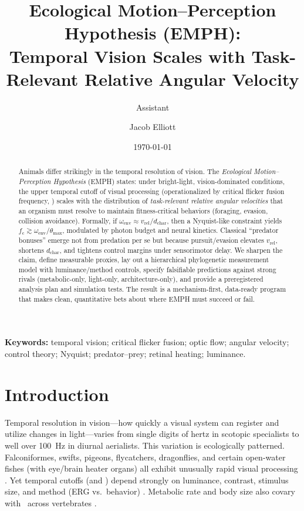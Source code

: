 \documentclass[11pt]{article}
\title{\vspace{-10pt}\textbf{Ecological Motion--Perception Hypothesis (EMPH):}\\
Temporal Vision Scales with Task-Relevant Relative Angular Velocity}
\author[1]{Assistant}
\author[2]{Jacob Elliott}
\affil[1,2]{\small Independent Research Draft (v0.2)}
\date{\small \today}
\newcommand{\fc}{f_{\mathrm{c}}}             %
\newcommand{\cff}{\mathrm{CFF}}               %
\newcommand{\vrel}{v_{\mathrm{rel}}}          %
\newcommand{\dchar}{d_{\mathrm{char}}}        %
\newcommand{\thetamax}{\theta_{\max}}         %
\begin{document}
\maketitle
\doublespacing

\begin{abstract}
Animals differ strikingly in the temporal resolution of vision. The \emph{Ecological Motion--Perception Hypothesis} (EMPH) states: under bright-light, vision-dominated conditions, the upper temporal cutoff of visual processing (operationalized by critical flicker fusion frequency, \cff) scales with the distribution of \emph{task-relevant relative angular velocities} that an organism must resolve to maintain fitness-critical behaviors (foraging, evasion, collision avoidance). Formally, if $\omega_{\text{env}} \approx \vrel/\dchar$, then a Nyquist-like constraint yields $\fc \gtrsim \omega_{\text{env}}/\thetamax$, modulated by photon budget and neural kinetics. Classical ``predator bonuses'' emerge not from predation per se but because pursuit/evasion elevates $\vrel$, shortens $\dchar$, and tightens control margins under sensorimotor delay. We sharpen the claim, define measurable proxies, lay out a hierarchical phylogenetic measurement model with luminance/method controls, specify falsifiable predictions against strong rivals (metabolic-only, light-only, architecture-only), and provide a preregistered analysis plan and simulation tests. The result is a mechanism-first, data-ready program that makes clean, quantitative bets about where EMPH must succeed or fail.
\end{abstract}

\noindent\textbf{Keywords:} temporal vision; critical flicker fusion; optic flow; angular velocity; control theory; Nyquist; predator--prey; retinal heating; luminance.

\section{Introduction}
Temporal resolution in vision---how quickly a visual system can register and utilize changes in light---varies from single digits of hertz in scotopic specialists to well over \SI{100}{Hz} in diurnal aerialists. This variation is ecologically patterned. Falconiformes, swifts, pigeons, flycatchers, dragonflies, and certain open-water fishes (with eye/brain heater organs) all exhibit unusually rapid visual processing \citep{Potier2020,Bostrom2016,SwordfishHeaters}. Yet temporal cutoffs (and \cff) depend strongly on luminance, contrast, stimulus size, and method (ERG vs.\ behavior) \citep{DeLangeCSF,WatsonTemporalCSF}. Metabolic rate and body size also covary with \cff\ across vertebrates \citep{Healy2013}.
\end{document}
